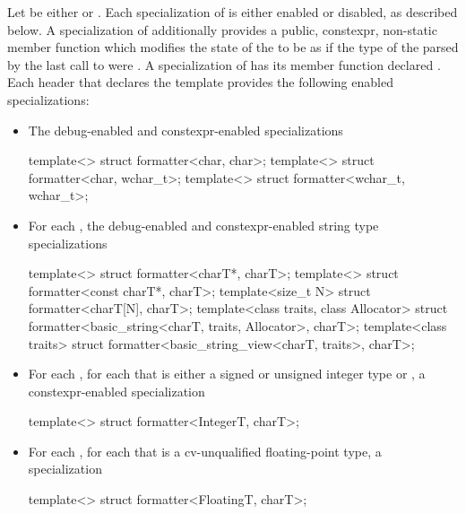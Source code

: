 \pnum
Let  be either  or .
Each specialization of  is either enabled or disabled,
as described below.
%
A  specialization of 
additionally provides
a public, constexpr, non-static member function 
which modifies the state of the  to be as if
the type of the 
parsed by the last call to  were .
A  specialization of 
has its  member function declared .
Each header that declares the template 
provides the following enabled specializations:
\begin{itemize}
\item
{}%
The debug-enabled and constexpr-enabled specializations
\begin{codeblock}
template<> struct formatter<char, char>;
template<> struct formatter<char, wchar_t>;
template<> struct formatter<wchar_t, wchar_t>;
\end{codeblock}

\item
{}%
For each ,
the debug-enabled and constexpr-enabled string type specializations
\begin{codeblock}
template<> struct formatter<charT*, charT>;
template<> struct formatter<const charT*, charT>;
template<size_t N> struct formatter<charT[N], charT>;
template<class traits, class Allocator>
  struct formatter<basic_string<charT, traits, Allocator>, charT>;
template<class traits>
  struct formatter<basic_string_view<charT, traits>, charT>;
\end{codeblock}

\item
{}%
For each ,
for each  that is either
a signed or unsigned integer type or ,
a constexpr-enabled specialization
\begin{codeblock}
template<> struct formatter<IntegerT, charT>;
\end{codeblock}

\item
{}%
For each ,
for each  that is a cv-unqualified floating-point type,
a specialization
\begin{codeblock}
template<> struct formatter<FloatingT, charT>;
\end{codeblock}


\end{itemize}
